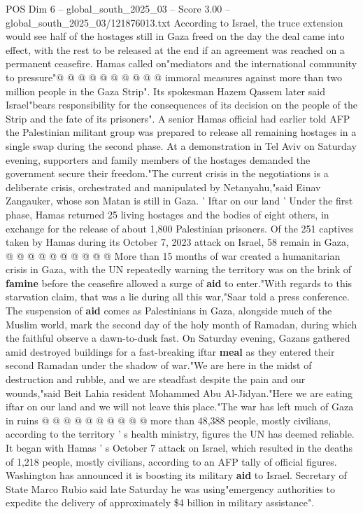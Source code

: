 \begin{textsample}{POS Dim 6 – global\_south\_2025\_03 – Score 3.00 – global\_south\_2025\_03/121876013.txt}
According to Israel, the truce extension would see half of the hostages still in Gaza freed on the day the deal came into effect, with the rest to be released at the end if an agreement was reached on a permanent ceasefire.
Hamas called on"mediators and the international community to pressure"@ @ @ @ @ @ @ @ @ @ immoral measures against more than two million people in the Gaza Strip".
Its spokesman Hazem Qassem later said Israel"bears responsibility for the consequences of its decision on the people of the Strip and the fate of its prisoners".
A senior Hamas official had earlier told AFP the Palestinian militant group was prepared to release all remaining hostages in a single swap during the second phase.
At a demonstration in Tel Aviv on Saturday evening, supporters and family members of the hostages demanded the government secure their freedom."The current crisis in the negotiations is a deliberate crisis, orchestrated and manipulated by Netanyahu,"said Einav Zangauker, whose son Matan is still in Gaza. ' Iftar on our land ' Under the first phase, Hamas returned 25 living hostages and the bodies of eight others, in exchange for the release of about 1,800 Palestinian prisoners.
Of the 251 captives taken by Hamas during its October 7, 2023 attack on Israel, 58 remain in Gaza, @ @ @ @ @ @ @ @ @ @ More than 15 months of war created a humanitarian crisis in Gaza, with the UN repeatedly warning the territory was on the brink of \textbf{famine} before the ceasefire allowed a surge of \textbf{aid} to enter."With regards to this starvation claim, that was a lie during all this war,"Saar told a press conference.
The suspension of \textbf{aid} comes as Palestinians in Gaza, alongside much of the Muslim world, mark the second day of the holy month of Ramadan, during which the faithful observe a dawn-to-dusk fast.
On Saturday evening, Gazans gathered amid destroyed buildings for a fast-breaking iftar \textbf{meal} as they entered their second Ramadan under the shadow of war."We are here in the midst of destruction and rubble, and we are steadfast despite the pain and our wounds,"said Beit Lahia resident Mohammed Abu Al-Jidyan."Here we are eating iftar on our land and we will not leave this place."The war has left much of Gaza in ruins @ @ @ @ @ @ @ @ @ @ more than 48,388 people, mostly civilians, according to the territory ' s health ministry, figures the UN has deemed reliable.
It began with Hamas ' s October 7 attack on Israel, which resulted in the deaths of 1,218 people, mostly civilians, according to an AFP tally of official figures.
Washington has announced it is boosting its military \textbf{aid} to Israel.
Secretary of State Marco Rubio said late Saturday he was using"emergency authorities to expedite the delivery of approximately \$4 billion in military assistance".

\end{textsample}
